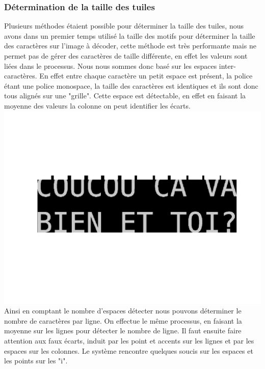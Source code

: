 \documentclass[a4paper,12pt,titlepage]{report}
\begin{document}
	\subsubsection{Détermination de la taille des tuiles}
	Plusieurs méthodes étaient possible pour déterminer la taille des tuiles, nous avons dans un premier temps utilisé la taille des motifs pour déterminer la taille des caractères sur l'image à décoder, cette méthode est très performante mais ne permet pas de gérer des caractères de taille différente, en effet les valeurs sont liées dans le processus. Nous nous sommes donc basé sur les espaces inter-caractères. En effet entre chaque caractère un petit espace est présent, la police étant une police monospace, la taille des caractères est identiques et ils sont donc tous alignés sur une "grille". Cette espace est détectable, en effet en faisant la moyenne des valeurs la colonne on peut identifier les écarts.
	\includegraphics[scale=0.5]{../illus/detectionSpace.png}
	Ainsi en comptant le nombre d'espaces détecter nous pouvons déterminer le nombre de caractères par ligne.
	On effectue le même processus, en faisant la moyenne sur les lignes pour détecter le nombre de ligne.
	Il faut ensuite faire attention aux faux écarts, induit par les point et accents sur les lignes et par les espaces sur les colonnes.
	Le système rencontre quelques soucis sur les espaces et les points sur les "i".
\end{document}
